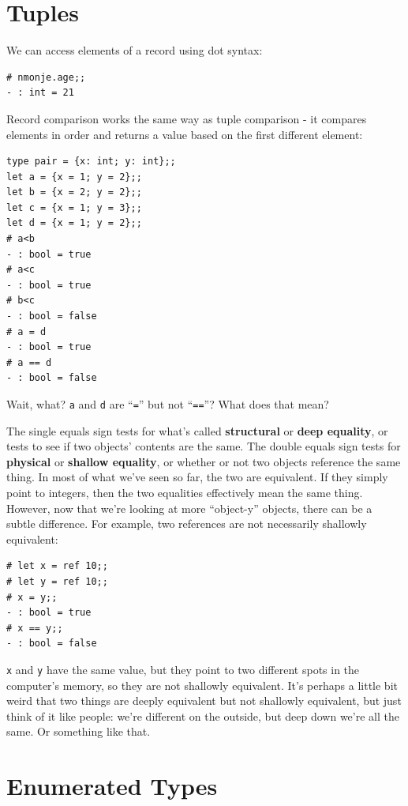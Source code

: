 \documentclass[10pt]{book}
\begin{document}
{\section{Tuples}

We can access elements of a record using dot syntax:

\beforeverb
\begin{verbatim}
# nmonje.age;;
- : int = 21
\end{verbatim}
\afterverb

Record comparison works the same way as tuple comparison - it compares 
elements in order and returns a value based on the first different element:

\beforeverb
\begin{verbatim}
type pair = {x: int; y: int};;
let a = {x = 1; y = 2};;
let b = {x = 2; y = 2};;
let c = {x = 1; y = 3};;
let d = {x = 1; y = 2};;
# a<b
- : bool = true
# a<c
- : bool = true
# b<c
- : bool = false
# a = d
- : bool = true
# a == d
- : bool = false
\end{verbatim}
\afterverb

Wait, what? {\tt a} and {\tt d} are ``{\tt =}'' but not ``{\tt ==}''? What does that mean?

The single equals sign tests for what's called {\bf structural} or {\bf deep equality}, or tests to see if two objects' contents are the same. The double equals sign tests for {\bf physical} or {\bf shallow equality}, or whether or not two objects reference the same thing. In most of what we've seen so far, the two are equivalent. If they simply point to integers, then the two equalities effectively mean the same thing. However, now that we're looking at more ``object-y'' objects, there can be a subtle difference. For example, two references are not necessarily shallowly equivalent:

\beforeverb
\begin{verbatim}
# let x = ref 10;;
# let y = ref 10;;
# x = y;;
- : bool = true
# x == y;;
- : bool = false
\end{verbatim}
\afterverb

{\tt x} and {\tt y} have the same value, but they point to two different spots in the computer's memory, so they are not shallowly equivalent. It's perhaps a little bit weird that two things are deeply equivalent but not shallowly equivalent, but just think of it like people: we're different on the outside, but deep down we're all the same. Or something like that.

\section{Enumerated Types}

}
\end{document}
